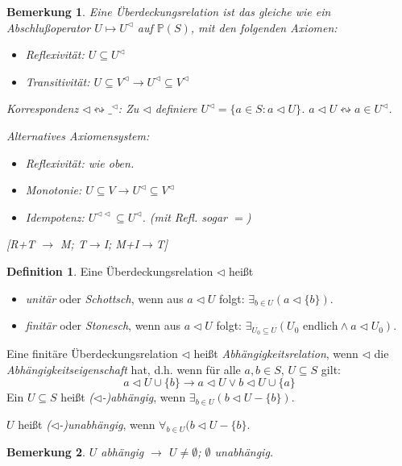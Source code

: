 \documentclass[headsepline=true,DIV=11]{scrartcl}
\newtheorem*{remark}{Bemerkung}
\theoremstyle{definition}
\newtheorem*{definition}{Definition}
\begin{document}
\begin{remark}
	Eine Überdeckungsrelation ist das gleiche wie ein {\em Abschlußoperator} $U\mapsto U^{\lhd}$ auf $\mathbb P(S)$, mit den folgenden Axiomen:
	\begin{itemize}
		\item {\em Reflexivität}: $U\subseteq U^\lhd$
		\item {\em Transitivität}: $U\subseteq V^\lhd \to U^\lhd \subseteq V^\lhd$ %
	\end{itemize}
	Korrespondenz $\lhd \leftrightsquigarrow \_^{\lhd}$:
	Zu $\lhd$ definiere $U^\lhd= \{a\in S: a\lhd U\}$.
	$a\lhd U \leftrightsquigarrow a\in U^\lhd$.

	Alternatives Axiomensystem:
	\begin{itemize}
		\item Reflexivität: wie oben.
		\item Monotonie: $U\subseteq V \to U^\lhd \subseteq V^\lhd$
		\item Idempotenz: $U^{\lhd\lhd} \subseteq U^{\lhd}$. (mit Refl. sogar $=$)
	\end{itemize}
	[R+T $\to$ M; T$\to$I; M+I$\to$T]
\end{remark}

\begin{definition}
	Eine Überdeckungsrelation $\lhd$ heißt
	\begin{itemize}
		\item {\em unitär} oder {\em Schottsch}, wenn aus $a\lhd U$ folgt: $\exists_{b\in U}(a\lhd\{b\})$.
		\item {\em finitär} oder {\em Stonesch}, wenn aus $a\lhd U$ folgt: $\exists_{U_0\subseteq U} (U_0 \text{ endlich} \land a\lhd U_0)$.
	\end{itemize}
	Eine finitäre Überdeckungsrelation $\lhd$ heißt {\em Abhängigkeitsrelation}, wenn $\lhd$ die {\em Abhängigkeitseigenschaft} hat, d.h.
	wenn für alle $a,b\in S$, $U\subseteq S$ gilt: 
	\[ a\lhd U\cup\{b\}\to a\lhd U\lor b\lhd U\cup\{a\}\]
	Ein $U\subseteq S$ heißt {\em ($\lhd$-)abhängig}, wenn $\exists_{b\in U}(b\lhd U-\{b\})$.
	
	$U$ heißt {\em ($\lhd$-)unabhängig}, wenn  $\forall_{b\in U}(b\lhd U-\{b\}$.
\end{definition}

\begin{remark}
	$U$ abhängig $\to$ $U\neq\emptyset$; $\emptyset$ unabhängig.
\end{remark}
\end{document}
